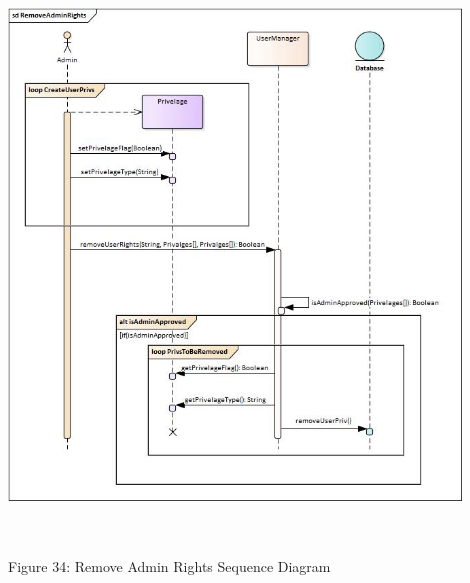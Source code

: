     \includegraphics[width=12cm,height=15cm,keepaspectratio]{admin_ui/images/sequence_diagrams/RemoveAdminRights.jpg}
		\begin{center}
	    \small{Figure 34: Remove Admin Rights Sequence Diagram}
    \end{center}
    

